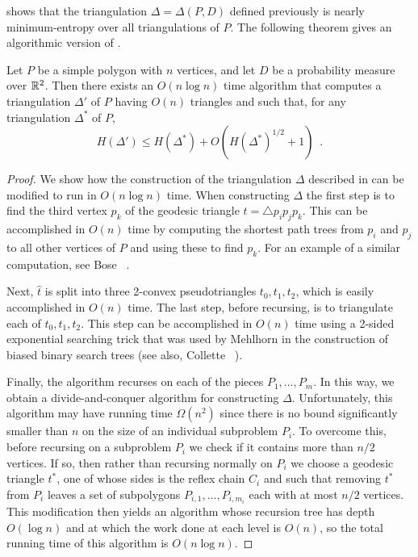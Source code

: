 \documentclass[lotsofwhite]{patmorin}
\newcommand{\z}[1]{{\hat{#1}}}
\begin{document}
 shows that the triangulation
$\Delta=\Delta(P,D)$ defined previously is nearly minimum-entropy over
all triangulations of $P$.  The following theorem gives an algorithmic
version of .

\begin{thm}
Let $P$ be a simple polygon with $n$ vertices, and let $D$ be a
probability measure over $\mathbb{R}^2$.  Then there exists an $O(n\log n)$
time algorithm that computes a triangulation $\Delta'$ of $P$ having
$O(n)$ triangles and such that, for any triangulation $\Delta^*$ of
$P$,
\[
    H(\Delta') \le H(\Delta^*) + O(H(\Delta^*)^{1/2}+1) \enspace .
\]
\end{thm}

\begin{proof}
We show how the construction of the triangulation $\Delta$ described in
 can be modified to run in $O(n\log n)$ time.  When
constructing $\Delta$ the first step is to find the third vertex $p_k$ of the
geodesic triangle $t=\triangle p_i p_j p_k$.  This can be accomplished
in $O(n)$ time by computing the shortest path trees from $p_i$ and
$p_j$ to all other vertices of $P$ and using these to find $p_k$.  For
an example of a similar computation, see Bose \etal\
\cite[Section~2.2]{bdhlim07}.

Next, $\z t$ is split into three 2-convex pseudotriangles $t_0,t_1,t_2$,
which is easily accomplished in $O(n)$ time.  The last step, before
recursing, is to triangulate each of $t_0,t_1,t_2$.  This step can be
accomplished in $O(n)$ time using a 2-sided exponential searching
trick that was used by Mehlhorn \cite{m75} in the construction of
biased binary search trees (see also, Collette \etal\
\cite[Theorem~1]{cdilm08}).

Finally, the algorithm recurses on each of the pieces
$P_1,\ldots,P_m$.  In this way, we obtain a divide-and-conquer
algorithm for constructing $\Delta$.  Unfortunately, this algorithm
may have running time $\Omega(n^2)$ since there is no bound
significantly smaller than $n$ on the size of an individual subproblem
$P_i$.  To overcome this, before recursing on a subproblem $P_i$ we
check if it contains more than $n/2$ vertices.  If so, then rather
than recursing normally on $P_i$ we choose a geodesic triangle $t^*$,
one of whose sides is the reflex chain $C_i$ and such that removing
$t^*$ from $P_i$ leaves a set of subpolygons
$P_{i,1},\ldots,P_{i,m_i}$ each with at most $n/2$ vertices.  This
modification then yields an algorithm whose recursion tree has depth
$O(\log n)$ and at which the work done at each level is $O(n)$, so the
total running time of this algorithm is $O(n\log n)$.


\end{proof}
\end{document}
